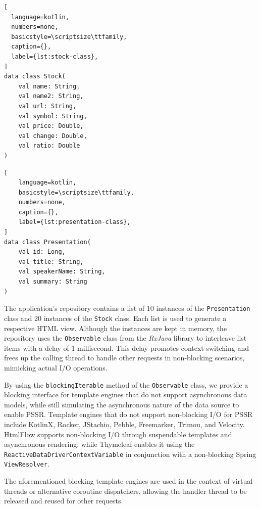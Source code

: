 \documentclass[software,article,accept,pdftex,moreauthors]{Definitions/mdpi}
\begin{document}
\begin{listing}[H]
\caption{\texttt{\hl{Stock}} class.}
            \begin{lstlisting}[
  language=kotlin,
  numbers=none,
  basicstyle=\scriptsize\ttfamily,
  caption={},
  label={lst:stock-class},
]
data class Stock(
    val name: String,
    val name2: String,
    val url: String,
    val symbol: String,
    val price: Double, 
    val change: Double, 
    val ratio: Double
)
\end{lstlisting}
\end{listing}

\begin{listing}[H]
\caption{\texttt{\hl{Presentation}} class.}
            \begin{lstlisting}[
    language=kotlin,
    basicstyle=\scriptsize\ttfamily,
    numbers=none,
    caption={},
    label={lst:presentation-class},
]
data class Presentation(
    val id: Long,
    val title: String, 
    val speakerName: String,
    val summary: String
)
\end{lstlisting}
\end{listing}

The application's repository contains a list of 10 instances of the
\texttt{Presentation} class and 20 instances of the \texttt{Stock} class. Each
list is used to generate a respective HTML view. Although the instances are
kept in memory, the repository uses the \texttt{Observable} class from the
\textit{RxJava} library to interleave list items with a delay of 1 millisecond.
This delay promotes context switching and frees up the calling thread to handle
other requests in non-blocking scenarios, mimicking actual I/O operations.

By using the \texttt{blockingIterable} method of the \texttt{Observable} class,
we provide a blocking interface for template engines that do not support
asynchronous data models, while still simulating the asynchronous nature of the
data source to enable PSSR\@. Template engines that do not support non-blocking
I/O for PSSR include KotlinX, Rocker, JStachio, Pebble, Freemarker, Trimou, and
Velocity. HtmlFlow supports non-blocking I/O through suspendable templates and
asynchronous rendering, while Thymeleaf enables it using the
\texttt{ReactiveDataDriverContextVariable} in conjunction with a non-blocking
Spring \texttt{ViewResolver}.

The aforementioned blocking template engines are used in the context of virtual
threads or alternative coroutine dispatchers, allowing the handler thread to be
released and reused for other requests.
\end{document}
